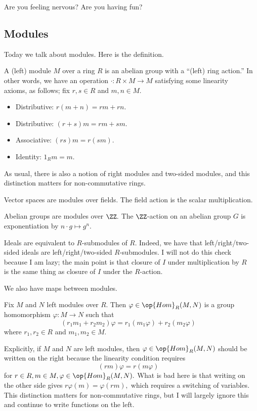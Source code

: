\documentclass[../notes.tex]{subfiles}
\begin{document}














Are you feeling nervous? Are you having fun?

\subsection{Modules}
Today we talk about modules. Here is the definition.
\begin{definition}[Module]
	A (left) module $M$ over a ring $R$ is an abelian group with a ``(left) ring action.'' In other words, we have an operation $\cdot:R\times M\to M$ satisfying some linearity axioms, as follows; fix $r,s\in R$ and $m,n\in M.$
	\begin{itemize}
		\item Distributive: $r(m+n)=rm+rn.$
		\item Distributive: $(r+s)m=rm+sm.$
		\item Associative: $(rs)m=r(sm).$
		\item Identity: $1_Rm=m.$
	\end{itemize}
\end{definition}
As usual, there is also a notion of right modules and two-sided modules, and this distinction matters for non-commutative rings.
\begin{example}
	Vector spaces are modules over fields. The field action is the scalar multiplication.
\end{example}
\begin{example}
	Abelian groups are modules over $\ZZ.$ The $\ZZ$-action on an abelian group $G$ is exponentiation by $n\cdot g\mapsto g^n.$
\end{example}
\begin{example}
	Ideals are equivalent to $R$-submodules of $R.$ Indeed, we have that left/right/two-sided ideals are left/right/two-sided $R$-submodules. I will not do this check because I am lazy; the main point is that closure of $I$ under multiplication by $R$ is the same thing as closure of $I$ under the $R$-action.
\end{example}
We also have maps between modules.
\begin{definition}
	Fix $M$ and $N$ left modules over $R.$ Then $\varphi\in\op{Hom}_R(M,N)$ is a group homomorphism $\varphi:M\to N$ such that
	\[(r_1m_1+r_2m_2)\varphi=r_1(m_1\varphi)+r_2(m_2\varphi)\]
	where $r_1,r_2\in R$ and $m_1,m_2\in M.$
\end{definition}
Explicitly, if $M$ and $N$ are left modules, then $\varphi\in\op{Hom}_R(M,N)$ should be written on the right because the linearity condition requires
\[(rm)\varphi=r(m\varphi)\]
for $r\in R,m\in M,\varphi\in\op{Hom}_R(M,N).$ What is bad here is that writing on the other side gives $r\varphi(m)=\varphi(rm),$ which requires a switching of variables. This distinction matters for non-commutative rings, but I will largely ignore this and continue to write functions on the left.
\end{document}

